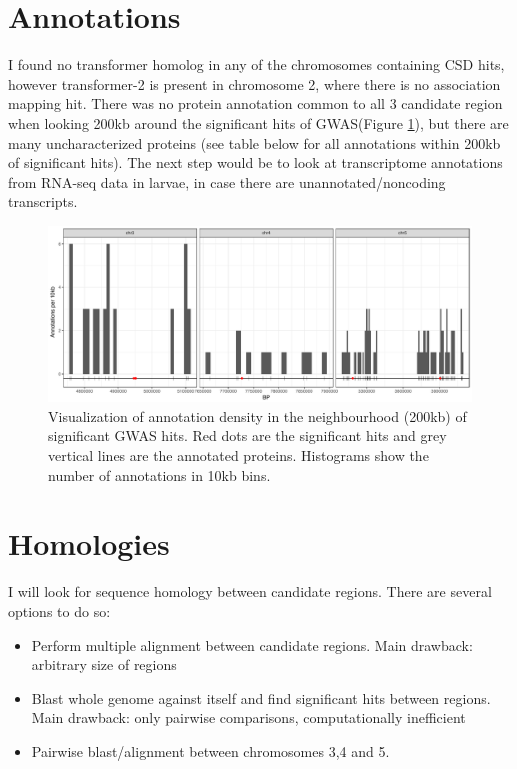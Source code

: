 \documentclass[10pt,a4paper]{report}
\begin{document}
\section{Annotations}
I found no transformer homolog in any of the chromosomes containing CSD hits, however transformer-2 is present in chromosome 2, where there is no association mapping hit. There was no protein annotation common to all 3 candidate region when looking 200kb around the significant hits of GWAS(Figure \ref{annot_visu}), but there are many uncharacterized proteins (see table below for all annotations within 200kb of significant hits). The next step would be to look at transcriptome annotations from RNA-seq data in larvae, in case there are unannotated/noncoding transcripts.

\begin{figure}[h!]
\begin{center}
\includegraphics[width=\textwidth]{annotations/annot_visu.pdf}
\caption{Visualization of annotation density in the neighbourhood (200kb) of significant GWAS hits. Red dots are the significant hits and grey vertical lines are the annotated proteins. Histograms show the number of annotations in 10kb bins.}
\label{annot_visu}
\end{center}
\end{figure}
\FloatBarrier
\begin{scriptsize}
\end{scriptsize}

\section{Homologies}
I will look for sequence homology between candidate regions. There are several options to do so:
\begin{itemize}
\item Perform multiple alignment between candidate regions. Main drawback: arbitrary size of regions
\item  Blast whole genome against itself and find significant hits between regions. Main drawback: only pairwise comparisons, computationally inefficient
\item Pairwise blast/alignment between chromosomes 3,4 and 5.
\end{itemize}
\end{document}

